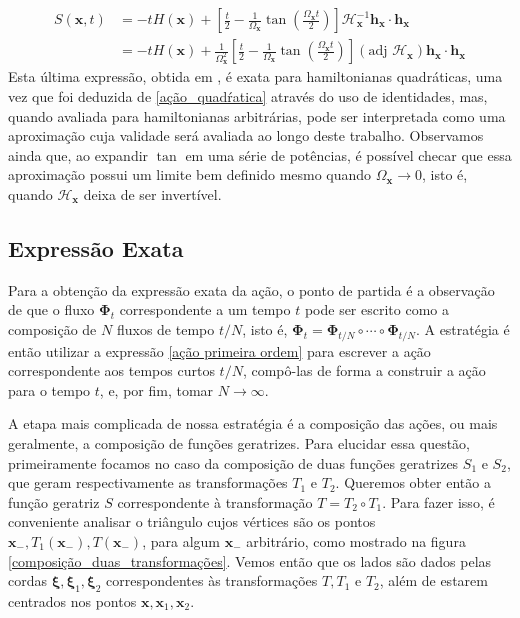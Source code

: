 \documentclass[
	12pt,
	oneside,			%
	a4paper,			%
	english,			%
	brazil				%
	]{abntex2}
\theoremstyle{definition}
\begin{document}
\begin{equation}
\label{metapletica_amortecida_real}
    \begin{aligned}
        S(\mathbf{x},t) &= -t H(\mathbf{x}) + \left[\frac{t}{2}-\frac{1}{\Omega_\mathbf{x}}\tan \left(\frac{\Omega_\mathbf{x} t}{2}\right)\right] \boldsymbol{\mathcal{H}}_\mathbf{x}^{-1}\mathbf{h}_\mathbf{x} \cdot \mathbf{h}_\mathbf{x} \\
        &= -t H(\mathbf{x}) + \frac{1}{\Omega_\mathbf{x}^2}\left[\frac{t}{2}-\frac{1}{\Omega_\mathbf{x}}\tan \left(\frac{\Omega_\mathbf{x} t}{2}\right)\right] \left( \text{adj } \boldsymbol{\mathcal{H}}_\mathbf{x} \right) \mathbf{h}_\mathbf{x} \cdot \mathbf{h}_\mathbf{x}
    \end{aligned}
\end{equation}
Esta última expressão, obtida em \cite{OZORIODEALMEIDA2021132951}, é exata para hamiltonianas quadráticas, uma vez que foi deduzida de \eqref{ação_quadŕatica} através do uso de identidades, mas, quando avaliada para hamiltonianas arbitrárias, pode ser interpretada como uma aproximação cuja validade será avaliada ao longo deste trabalho. Observamos ainda que, ao expandir $\tan$ em uma série de potências, é possível checar que essa aproximação possui um limite bem definido mesmo quando $\Omega_{\mathbf{x}} \to 0$, isto é, quando $\boldsymbol{\mathcal{H}}_\mathbf{x}$ deixa de ser invertível.

\subsection{Expressão Exata}

Para a obtenção da expressão exata da ação, o ponto de partida é a observação de que o fluxo $\boldsymbol{\Phi}_t$ correspondente a um tempo $t$ pode ser escrito como a composição de $N$ fluxos de tempo $t/N$, isto é, $\boldsymbol{\Phi}_t = \boldsymbol{\Phi}_{t/N} \circ \cdots \circ \boldsymbol{\Phi}_{t/N}$. A estratégia é então utilizar a expressão \eqref{ação primeira ordem} para escrever a ação correspondente aos tempos curtos $t/N$, compô-las de forma a construir a ação para o tempo $t$, e, por fim, tomar $N \to \infty$.

A etapa mais complicada de nossa estratégia é a composição das ações, ou mais geralmente, a composição de funções geratrizes. Para elucidar essa questão, primeiramente focamos no caso da composição de duas funções geratrizes $S_1$ e $S_2$, que geram respectivamente as transformações $T_1$ e $T_2$. Queremos obter então a função geratriz $S$ correspondente à transformação $T = T_2 \circ T_1$. Para fazer isso, é conveniente analisar o triângulo cujos vértices são os pontos $\mathbf{x}_-,T_1\left(\mathbf{x}_-\right),T\left(\mathbf{x}_-\right)$, para algum $\mathbf{x}_-$ arbitrário, como mostrado na figura \ref{composição_duas_transformações}. Vemos então que os lados são dados pelas cordas $\boldsymbol{\xi},\boldsymbol{\xi}_1,\boldsymbol{\xi}_2$ correspondentes às transformações $T,T_1$ e $T_2$, além de estarem centrados nos pontos $\mathbf{x},\mathbf{x}_1,\mathbf{x}_2$. 
\end{document}
